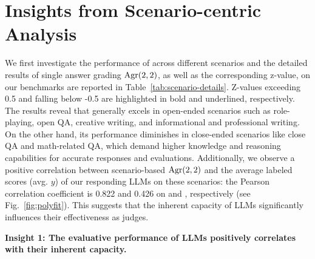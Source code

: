 




\section{Insights from Scenario-centric Analysis}
\label{sec:insight}




We first investigate the performance of \modelname across different scenarios and the detailed results of single answer grading $\mbox{Agr}(2,2)$, as well as the corresponding z-value, on our benchmarks are reported in Table~\ref{tab:scenario-details}. Z-values exceeding 0.5 and falling below -0.5 are highlighted in bold and underlined, respectively. %
The results reveal that \modelname generally excels in open-ended scenarios such as role-playing, open QA, creative writing, and informational and professional writing. On the other hand, its performance diminishes in close-ended scenarios like close QA and math-related QA, which demand higher knowledge and reasoning capabilities for accurate responses and evaluations. Additionally, we observe a positive correlation between scenario-based $\mbox{Agr}(2,2)$ and the average labeled scores (\ie avg. $y$) of our responding LLMs on these scenarios: the Pearson correlation coefficient is 0.822 and 0.426 on \aligndata and \syndata, respectively (see Fig.~\ref{fig:polyfit}). 
This suggests that the inherent capacity of LLMs significantly influences their effectiveness as judges.

\textbf{Insight 1: The evaluative performance of LLMs positively correlates with their inherent capacity.}


